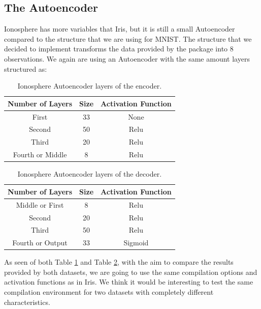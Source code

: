 \subsection{The Autoencoder}

Ionosphere has more variables that Iris, but it is still a small Autoencoder compared to the structure that we are using for MNIST. The structure that we decided to implement transforms the data provided by the package into 8 observations. We again are using an Autoencoder with the same amount layers structured as:  \newline

\begin{table}[H]
	\caption{Ionosphere Autoencoder layers of the encoder.}
	\begin{center}
		\label{tab:table_Ionosphere_auto_encoder}
		\begin{tabular}{c|c|c} %
			\textbf{Number of Layers} & \textbf{Size} & \textbf{Activation Function} \\
			\hline
			First & 33 & None\\
			Second & 50 & Relu\\
			Third & 20 & Relu\\
			Fourth or Middle & 8 & Relu\\
		\end{tabular}
	\end{center}
\end{table}

\begin{table}[H]
	\caption{Ionosphere Autoencoder layers of the decoder.}
	\begin{center}
		\label{tab:table_Ionosphere_auto_decoder}
		\begin{tabular}{c|c|c} %
			\textbf{Number of Layers} & \textbf{Size} & \textbf{Activation Function} \\
			\hline
			Middle or First & 8 & Relu\\
			Second & 20 & Relu\\
			Third & 50 & Relu\\
			Fourth or Output & 33 & Sigmoid\\
		\end{tabular}
	\end{center}
\end{table}

As seen of both Table \ref{tab:table_Ionosphere_auto_encoder} and Table \ref{tab:table_Ionosphere_auto_decoder}, with the aim to compare the results provided by both datasets, we are going to use the same compilation options and activation functions as in Iris. We think it would be interesting to test the same compilation environment for two datasets with completely different characteristics.\par

